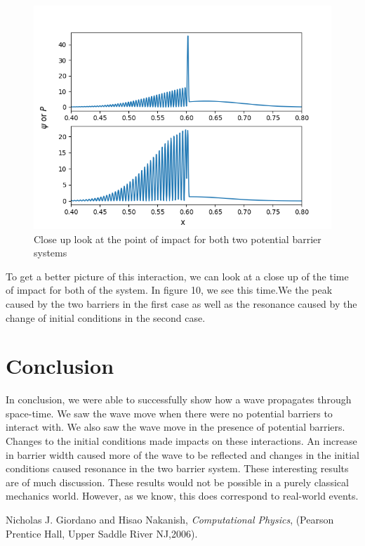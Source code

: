 \documentclass[pra,twocolumn,showpacs,amsmath,amssymb]{revtex4-2}
\begin{document}
\begin{figure}[t!]
\includegraphics[scale=0.50]{close_up.png}
\caption{Close up look at the point of impact for both two potential barrier systems}\label{autocorr}
\end{figure}

\par To get a better picture of this interaction, we can look at a close up of the time of impact for both of the system. In figure 10, we see this time.We the peak caused by the two barriers in the first case as well as the resonance caused by the change of initial conditions in the second case.

\section{Conclusion} \label{sec:conclusion}

In conclusion, we were able to successfully show how a wave propagates through space-time. We saw the wave move when there were no potential barriers to interact with. We also saw the wave move in the presence of potential barriers. Changes to the initial conditions made impacts on these interactions. An increase in barrier width caused more of the wave to be reflected and changes in the initial conditions caused resonance in the two barrier system. These interesting results are of much discussion. These results would not be possible in a purely classical mechanics world. However, as we know, this does correspond to real-world events.

\begin{thebibliography}{9}
\bibitem{}Nicholas J. Giordano and Hisao Nakanish, \emph{Computational Physics}, (Pearson Prentice Hall, Upper Saddle River NJ,2006).
\end{thebibliography}
\end{document}
